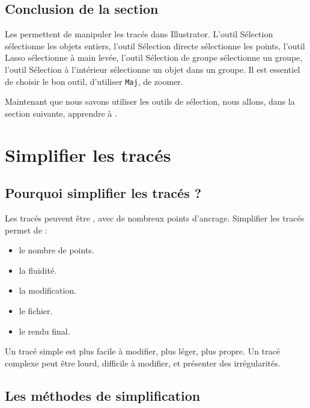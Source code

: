 \subsection*{Conclusion de la section}

Les  permettent de manipuler les tracés dans Illustrator. L'outil Sélection sélectionne les objets entiers, l'outil Sélection directe sélectionne les points, l'outil Lasso sélectionne à main levée, l'outil Sélection de groupe sélectionne un groupe, l'outil Sélection à l'intérieur sélectionne un objet dans un groupe. Il est essentiel de choisir le bon outil, d'utiliser \texttt{Maj}, de zoomer.

Maintenant que nous savons utiliser les outils de sélection, nous allons, dans la section suivante, apprendre à .

\section{Simplifier les tracés}

\subsection{Pourquoi simplifier les tracés ?}

Les tracés peuvent être , avec de nombreux points d'ancrage. Simplifier les tracés permet de :

\begin{itemize}
    \item {} le nombre de points.
    \item {} la fluidité.
    \item {} la modification.
    \item {} le fichier.
    \item {} le rendu final.
\end{itemize}

Un tracé simple est plus facile à modifier, plus léger, plus propre. Un tracé complexe peut être lourd, difficile à modifier, et présenter des irrégularités.

\subsection{Les méthodes de simplification}

